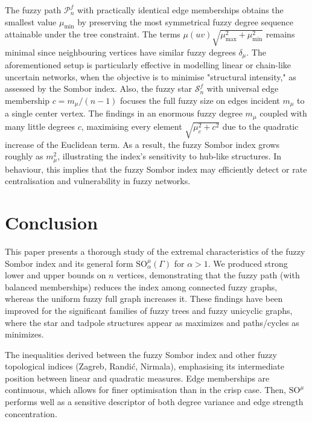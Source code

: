 \documentclass[12pt]{amsart}
\newcommand{\SOG}{\mathrm{SO}^{\mu}}
\newcommand{\PP}{\mathcal{P}}
\newcommand{\SN}{\mathcal{S}}
\begin{document}
The fuzzy path $\PP_n^f$ with practically identical edge memberships obtains the smallest value $\mu_{\min}$ by preserving the most symmetrical fuzzy degree sequence attainable under the tree constraint. The terms $\mu(uv)\sqrt{\mu_{\max}^2+\mu_{\min}^2}$ remains minimal since neighbouring vertices have similar fuzzy degrees $\delta_{\mu}$. The aforementioned setup is particularly effective in modelling linear or chain-like uncertain networks, when the objective is to minimise "structural intensity," as assessed by the Sombor index. Also, the fuzzy star $\SN_n^f$ with universal edge membership $c=m_{\mu}/(n-1)$ focuses the full fuzzy size on edges incident $m_{\mu}$ to a single center vertex. The findings in an enormous fuzzy degree $m_{\mu}$ coupled with many little degrees $c$, maximising every element $\sqrt{\mu_c^2+c^2}$ due to the quadratic increase of the Euclidean term. As a result, the fuzzy Sombor index grows roughly as $m_{\mu}^2$, illustrating the index's sensitivity to hub-like structures. In behaviour, this implies that the fuzzy Sombor index may efficiently detect or rate centralisation and vulnerability in fuzzy networks.

\section{Conclusion}
This paper presents a thorough study of the extremal characteristics of the fuzzy Sombor index and its general form $\SOG_{\alpha}(\Gamma)$ for $\alpha>1$. We produced strong lower and upper bounds on $n$ vertices, demonstrating that the fuzzy path (with balanced memberships) reduces the index among connected fuzzy graphs, whereas the uniform fuzzy full graph increases it. These findings have been improved for the significant families of fuzzy trees and fuzzy unicyclic graphs, where the star and tadpole structures appear as maximizes and paths/cycles as minimizes.

The inequalities derived between the fuzzy Sombor index and other fuzzy topological indices (Zagreb, Randić, Nirmala), emphasising its intermediate position between linear and quadratic measures. Edge memberships are continuous, which allows for finer optimisation than in the crisp case. Then, $\SOG$ performs well as a sensitive descriptor of both degree variance and edge strength concentration. 




\end{document}
